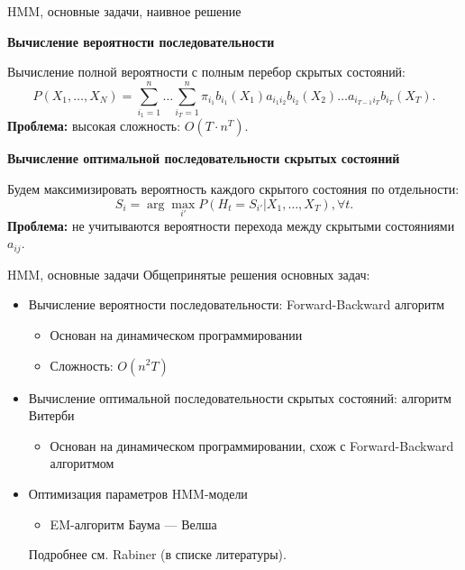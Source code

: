 \fi
\begin{frame}{HMM, основные задачи, наивное решение}

\textbf{Вычисление вероятности последовательности}

Вычисление полной вероятности с полным перебор скрытых состояний:
\[
    P(X_1,\dots,X_N) = \sum_{i_1=1}^n\dots\sum_{i_T=1}^n\pi_{i_1}b_{i_1}(X_1)a_{i_1 i_2}b_{i_2}(X_2)\dots a_{i_{T-1} i_T} b_{i_T}(X_T).
\]
\textbf{Проблема:} высокая сложность: $O(T\cdot n^T)$.

\vspace{1cm}
\textbf{Вычисление оптимальной последовательности скрытых состояний}

Будем максимизировать вероятность каждого скрытого состояния по отдельности:
\[
    S_i  = \arg\max_{i'} P(H_t = S_{i'}|X_1,\dots,X_T), \forall t.
\]
\textbf{Проблема:} не учитываются вероятности перехода между скрытыми состояниями $a_{ij}$.

\end{frame}

\begin{frame}{HMM, основные задачи}
Общепринятые решения основных задач:
\begin{itemize}
\item Вычисление вероятности последовательности: Forward-Backward алгоритм
\begin{itemize}
\item Основан на динамическом программировании
\item Сложность: $O(n^2T)$
\end{itemize}

\item Вычисление оптимальной последовательности скрытых состояний: алгоритм Витерби
\begin{itemize}
\item Основан на динамическом программировании, схож с Forward-Backward алгоритмом
\end{itemize}

\item Оптимизация параметров HMM-модели
\begin{itemize}
\item EM-алгоритм Баума — Велша
\end{itemize}

Подробнее см. Rabiner (в списке литературы).
\end{itemize}

\end{frame}


